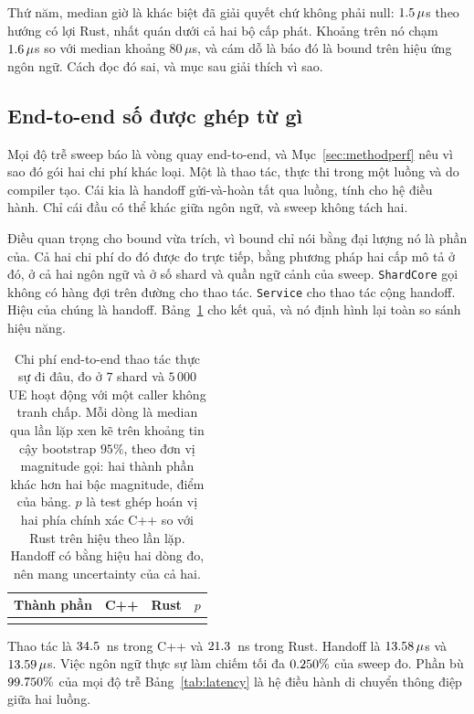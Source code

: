 Thứ năm, median giờ là khác biệt đã giải quyết chứ không phải null: $1.5\,\mu$s
theo hướng có lợi Rust, nhất quán dưới cả hai bộ cấp phát. Khoảng trên nó chạm
$1.6\,\mu$s so với median khoảng $80\,\mu$s, và cám dỗ là báo
đó là bound trên hiệu ứng ngôn ngữ. Cách đọc đó sai, và mục
sau giải thích vì sao.

\subsection{End-to-end số được ghép từ gì}\label{sec:budget}
Mọi độ trễ sweep báo là vòng quay end-to-end, và
Mục~\ref{sec:methodperf} nêu vì sao đó gói hai chi phí khác loại.
Một là thao tác, thực thi trong một luồng và do compiler tạo. Cái kia
là handoff gửi-và-hoàn tất qua luồng, tính cho hệ điều hành.
Chỉ cái đầu có thể khác giữa ngôn ngữ, và sweep không tách hai.

Điều quan trọng cho bound vừa trích, vì bound chỉ nói bằng đại lượng
nó là phần của. Cả hai chi phí do đó được đo trực tiếp, bằng phương pháp hai cấp
mô tả ở đó, ở cả hai ngôn ngữ và ở số shard và quần ngữ cảnh của sweep.
\texttt{ShardCore} gọi không có hàng đợi trên đường cho thao tác. \texttt{Service} cho
thao tác cộng handoff. Hiệu của chúng là handoff.
Bảng~\ref{tab:budget} cho kết quả, và nó định hình lại toàn so sánh hiệu năng.

\begin{table}[H]
\centering
\small
\caption[Chi phí end-to-end thực sự đi đâu]{Chi phí end-to-end thao tác thực sự đi đâu, đo ở $7$ shard và
$5\,000$ UE hoạt động với một caller không tranh chấp. Mỗi dòng là median qua
\BudgetRepeats{} lần lặp xen kẽ trên khoảng tin cậy bootstrap $95\%$, theo
đơn vị magnitude gọi: hai thành phần khác hơn hai bậc magnitude,
điểm của bảng. $p$ là test ghép hoán vị hai phía chính xác C++
so với Rust trên hiệu theo lần lặp. Handoff có bằng hiệu hai dòng
đo, nên mang uncertainty của cả hai.\label{tab:budget}}
\begin{tabular}{@{}l r r r@{}}
\hline\hline
Thành phần & C++ & Rust & $p$ \\
\hline
\\
\hline
\end{tabular}
\end{table}

Thao tác là $34.5$~ns trong C++ và $21.3$~ns trong Rust. Handoff là
$13.58\,\mu$s và $13.59\,\mu$s. Việc ngôn ngữ thực sự
làm chiếm tối đa $0.250\%$ của sweep đo. Phần
bù $99.750\%$ của mọi độ trễ Bảng~\ref{tab:latency} là hệ điều hành di chuyển thông điệp giữa hai luồng.

